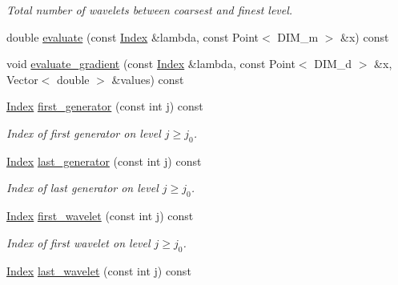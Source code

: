 \begin{CompactItemize}
\begin{CompactList}\small\item\em Total number of wavelets between coarsest and finest level. \item\end{CompactList}\item 
double \hyperlink{classFrameTL_1_1AggregatedFrame_0583fb8cb8deeefc8884c8c4dfb5d25b}{evaluate} (const \hyperlink{classFrameTL_1_1FrameIndex}{Index} \&lambda, const Point$<$ DIM\_\-m $>$ \&x) const 
\item 
void \hyperlink{classFrameTL_1_1AggregatedFrame_43c97c9d5c3931b1b61abe37514c650a}{evaluate\_\-gradient} (const \hyperlink{classFrameTL_1_1FrameIndex}{Index} \&lambda, const Point$<$ DIM\_\-d $>$ \&x, Vector$<$ double $>$ \&values) const 
\item 
\hypertarget{classFrameTL_1_1AggregatedFrame_9b0852894c8365ad33b0a084233a9097}{
\hyperlink{classFrameTL_1_1FrameIndex}{Index} \hyperlink{classFrameTL_1_1AggregatedFrame_9b0852894c8365ad33b0a084233a9097}{first\_\-generator} (const int j) const }
\label{classFrameTL_1_1AggregatedFrame_9b0852894c8365ad33b0a084233a9097}

\begin{CompactList}\small\item\em Index of first generator on level $j \geq j_0$. \item\end{CompactList}\item 
\hypertarget{classFrameTL_1_1AggregatedFrame_9f71f4df3a878e6e0759a78cecfe07e8}{
\hyperlink{classFrameTL_1_1FrameIndex}{Index} \hyperlink{classFrameTL_1_1AggregatedFrame_9f71f4df3a878e6e0759a78cecfe07e8}{last\_\-generator} (const int j) const }
\label{classFrameTL_1_1AggregatedFrame_9f71f4df3a878e6e0759a78cecfe07e8}

\begin{CompactList}\small\item\em Index of last generator on level $j \geq j_0$. \item\end{CompactList}\item 
\hypertarget{classFrameTL_1_1AggregatedFrame_b70535d492851851573f319e5f797e14}{
\hyperlink{classFrameTL_1_1FrameIndex}{Index} \hyperlink{classFrameTL_1_1AggregatedFrame_b70535d492851851573f319e5f797e14}{first\_\-wavelet} (const int j) const }
\label{classFrameTL_1_1AggregatedFrame_b70535d492851851573f319e5f797e14}

\begin{CompactList}\small\item\em Index of first wavelet on level $j \geq j_0$. \item\end{CompactList}\item 
\hypertarget{classFrameTL_1_1AggregatedFrame_94a3d652d3a1b18ae84987bb2e601750}{
\hyperlink{classFrameTL_1_1FrameIndex}{Index} \hyperlink{classFrameTL_1_1AggregatedFrame_94a3d652d3a1b18ae84987bb2e601750}{last\_\-wavelet} (const int j) const }
\label{classFrameTL_1_1AggregatedFrame_94a3d652d3a1b18ae84987bb2e601750}


\end{CompactItemize}
